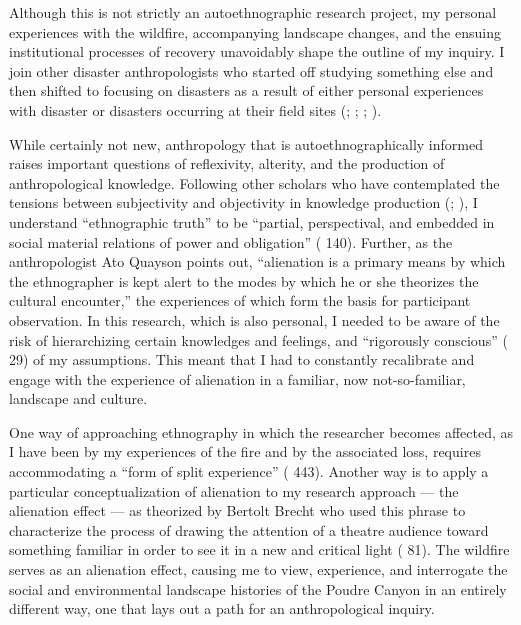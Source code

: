 \documentclass[
]{article}
\begin{document}
Although this is not strictly an autoethnographic research project, my personal experiences with the wildfire, accompanying landscape changes, and the ensuing institutional processes of recovery unavoidably shape the outline of my inquiry. I join other disaster anthropologists who started off studying something else and then shifted to focusing on disasters as a result of either personal experiences with disaster or disasters occurring at their field sites (; ; ; ).

While certainly not new, anthropology that is autoethnographically informed raises important questions of reflexivity, alterity, and the production of anthropological knowledge. Following other scholars who have contemplated the tensions between subjectivity and objectivity in knowledge production (; ), I understand ``ethnographic truth'' to be ``partial, perspectival, and embedded in social material relations of power and obligation'' ( 140). Further, as the anthropologist Ato Quayson points out, ``alienation is a primary means by which the ethnographer is kept alert to the modes by which he or she theorizes the cultural encounter,'' the experiences of which form the basis for participant observation. In this research, which is also personal, I needed to be aware of the risk of hierarchizing certain knowledges and feelings, and ``rigorously conscious'' ( 29) of my assumptions. This meant that I had to constantly recalibrate and engage with the experience of alienation in a familiar, now not-so-familiar, landscape and culture.

One way of approaching ethnography in which the researcher becomes affected, as I have been by my experiences of the fire and by the associated loss, requires accommodating a ``form of split experience'' ( 443). Another way is to apply a particular conceptualization of alienation to my research approach --- the alienation effect --- as theorized by Bertolt Brecht who used this phrase to characterize the process of drawing the attention of a theatre audience toward something familiar in order to see it in a new and critical light ( 81). The wildfire serves as an alienation effect, causing me to view, experience, and interrogate the social and environmental landscape histories of the Poudre Canyon in an entirely different way, one that lays out a path for an anthropological inquiry.
\end{document}
